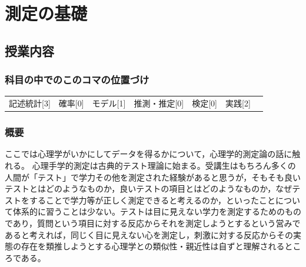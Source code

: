 \section{測定の基礎}
\label{s06_ctt}

\subsection{授業内容}
\subsubsection{科目の中でのこのコマの位置づけ}
\begin{tabular}[t]{ccccccc}
	記述統計[3] & 確率[0] & モデル[1] & 推測・推定[0] & 検定[0] & 実践[2]
\end{tabular}
\subsubsection{概要}
ここでは心理学がいかにしてデータを得るかについて，心理学的測定論の話に触れる。
心理手学的測定は古典的テスト理論に始まる。受講生はもちろん多くの人間が「テスト」で学力その他を測定された経験があると思うが，そもそも良いテストとはどのようなものか，良いテストの項目とはどのようなものか，なぜテストをすることで学力等が正しく測定できると考えるのか，といったことについて体系的に習うことは少ない。テストは目に見えない学力を測定するためのものであり，質問という項目に対する反応からそれを測定しようとするという営みであると考えれば，同じく目に見えない心を測定し，刺激に対する反応からその実態の存在を類推しようとする心理学との類似性・親近性は自ずと理解されるところである。
